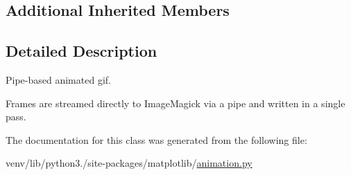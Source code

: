 \subsection*{Additional Inherited Members}


\subsection{Detailed Description}
\begin{DoxyVerb}Pipe-based animated gif.

Frames are streamed directly to ImageMagick via a pipe and written
in a single pass.\end{DoxyVerb}
 

The documentation for this class was generated from the following file\+:\begin{DoxyCompactItemize}
\item 
venv/lib/python3./site-\/packages/matplotlib/\hyperlink{animation_8py}{animation.\+py}\end{DoxyCompactItemize}
